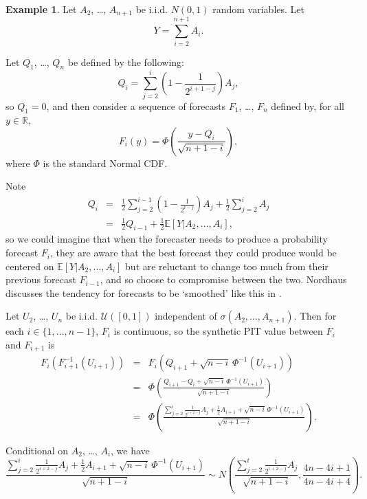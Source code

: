 \documentclass[aap]{imsart}
\theoremstyle{plain}
\theoremstyle{definition}
\newtheorem{example}[theorem]{Example}
\begin{document}
\begin{example}
Let $A_2$, \ldots, $A_{n+1}$ be i.i.d. $N(0,1)$ random variables. Let
\begin{equation*}
  Y = \sum_{i=2}^{n+1} A_i.
\end{equation*}

Let $Q_1$, \ldots, $Q_n$ be defined by the following:
\begin{equation*}
  Q_i = \sum_{j=2}^{i} \left(1 - \frac{1}{2^{i+1-j}}\right) A_j,
\end{equation*}
so $Q_1 = 0$, and then consider a sequence of forecasts $F_1$, \ldots, $F_n$ defined by, for all $y \in \mathbb{R}$,
\begin{equation*}
  F_i(y) = \Phi\left(\frac{y - Q_i}{\sqrt{n+1-i}}\right),
\end{equation*}
where $\Phi$ is the standard Normal CDF.

Note
\begin{eqnarray*}
  Q_i & = & \frac{1}{2} \sum_{j=2}^{i-1} \left(1 - \frac{1}{2^{i-j}}\right) A_j + \frac{1}{2} \sum_{j=2}^i A_j \\
      & = & \frac{1}{2} Q_{i-1} + \frac{1}{2} \mathbb{E}[Y|A_2, \ldots, A_i],
\end{eqnarray*}
so we could imagine that when the forecaster needs to produce a probability forecast $F_i$, they are aware that the best forecast they could produce would be centered on $\mathbb{E}[Y|A_2, \ldots, A_i]$ but are reluctant to change too much from their previous forecast $F_{i-1}$, and so choose to compromise between the two. Nordhaus discusses the tendency for forecasts to be `smoothed' like this in \cite{nrd87}.

Let $U_2$, \ldots, $U_n$ be i.i.d. $\mathcal{U}([0,1])$ independent of $\sigma(A_2, \ldots, A_{n+1})$. Then for each $i \in \{1, \ldots, n-1\}$, $F_i$ is continuous, so the synthetic PIT value between $F_i$ and $F_{i+1}$ is
\begin{eqnarray*}
  F_i(F_{i+1}^{-1}(U_{i+1})) & = & F_i\left(Q_{i+1} + \sqrt{n-i}\,\Phi^{-1}(U_{i+1})\right) \\
                             & = & \Phi\left(\frac{Q_{i+1} - Q_i + \sqrt{n-i} \,\Phi^{-1}(U_{i+1})}{\sqrt{n+1-i}} \right) \\
                             & = & \Phi\left(\frac{\sum_{j=2}^i \frac{1}{2^{i+2-j}} A_j + \frac{1}{2} A_{i+1} + \sqrt{n-i} \,\Phi^{-1}(U_{i+1})}{\sqrt{n+1-i}}\right).
\end{eqnarray*}

Conditional on $A_2$, \ldots, $A_i$, we have
\begin{equation*}
  \frac{\sum_{j=2}^i \frac{1}{2^{i+2-j}} A_j + \frac{1}{2} A_{i+1} + \sqrt{n-i} \,\Phi^{-1}(U_{i+1})}{\sqrt{n+1-i}} \sim N\left(\frac{\sum_{j=2}^i \frac{1}{2^{i+2-j}} A_j}{\sqrt{n+1-i}}, \frac{4n - 4i + 1}{4n - 4i + 4}\right).
\end{equation*}


\end{example}
\end{document}
